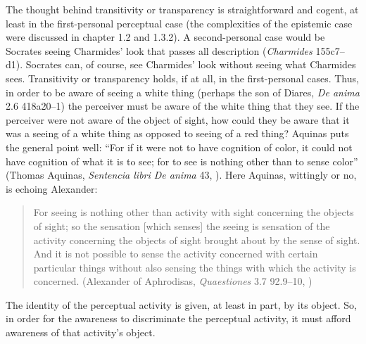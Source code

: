The thought behind transitivity or transparency is straightforward and cogent, at least in the first-personal perceptual case (the complexities of the epistemic case were discussed in chapter 1.2 and 1.3.2). A second-personal case would be Socrates seeing Charmides' look that passes all description (\emph{Charmides} 155c7–d1). Socrates can, of course, see Charmides' look without seeing what Charmides sees. Transitivity or transparency holds, if at all, in the first-personal cases. Thus, in order to be aware of seeing a white thing (perhaps the son of Diares, \emph{De anima} 2.6 418a20–1) the perceiver must be aware of the white thing that they see. If the perceiver were not aware of the object of sight, how could they be aware that it was a seeing of a white thing as opposed to seeing of a red thing? Aquinas puts the general point well: ``For if it were not to have cognition of color, it could not have cognition of what it is to see; for to see is nothing other than to sense color'' (Thomas Aquinas, \emph{Sentencia libri De anima} 43, \citealt[303]{Pasnau:1999pd}). Here Aquinas, wittingly or no, is echoing Alexander: 
\begin{quote}
	For seeing is nothing other than activity with sight concerning the objects of sight; so the sensation [which senses] the seeing is sensation of the activity concerning the objects of sight brought about by the sense of sight. And it is not possible to sense the activity concerned with certain particular things without also sensing the things with which the activity is concerned. (Alexander of Aphrodisas, \emph{Quaestiones} 3.7 92.9–10, \citealt[54]{Sharples:1994aa})
\end{quote}  
The identity of the perceptual activity is given, at least in part, by its object. So, in order for the awareness to discriminate the perceptual activity, it must afford awareness of that activity's object.

